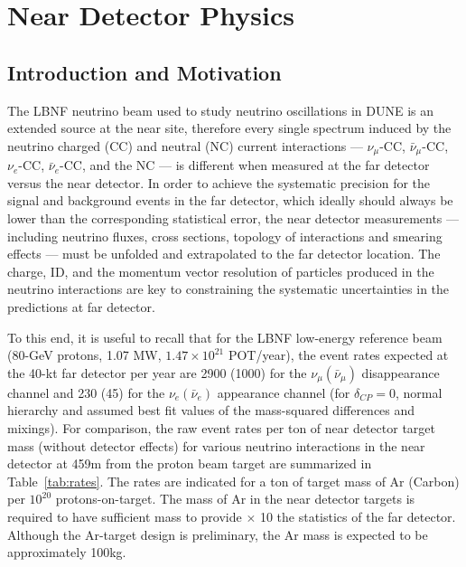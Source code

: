 
\chapter{Near Detector Physics}
\label{ch:physics-nd}

\section{Introduction and Motivation}
\label{sec:physics-nd-introduction}

The LBNF neutrino beam used to study neutrino oscillations in DUNE is
an extended source at the near site, therefore every single spectrum
induced by the neutrino charged (CC) and neutral (NC) current
interactions --- $\nu_\mu$-CC, $\bar \nu_\mu$-CC, $\nu_e$-CC, $\bar
\nu_e$-CC, and the NC --- is different when measured at the far
detector versus the near detector.  In order to achieve the systematic
precision for the signal and background events in the far detector,
which ideally should always be lower than the corresponding
statistical error, the near detector measurements --- including
neutrino fluxes, cross sections, topology of interactions and smearing
effects --- must be unfolded and extrapolated to the far detector
location.  The
charge, ID, and the momentum vector resolution of particles produced
in the neutrino interactions are %
key to constraining the systematic uncertainties in the predictions at
far detector.
%

To this end, it is useful to recall that for the LBNF low-energy reference beam
(80-GeV protons, 1.07 MW, $1.47 \times 10^{21} $ POT/year), the 
event rates expected at the 40-kt far detector per year are 
2900 (1000) for the $\nu_\mu (\bar \nu_\mu)$
disappearance channel and 230 (45) for the $\nu_e(\bar \nu_e)$
appearance channel (for $\delta_{CP}=0$, normal hierarchy and assumed best fit values of
the mass-squared differences and mixings). For comparison, the raw
event rates per ton of near detector target mass (without detector
effects) for various neutrino interactions in the near detector at
459m from the proton beam target are summarized in
Table~\ref{tab:rates}. The rates are indicated for a ton of target
mass of Ar (Carbon) per $10^{20}$ protons-on-target.  The mass of Ar
in the near detector targets is required to have sufficient mass to
provide $\times$ 10 the statistics of the far detector. Although the
Ar-target design is preliminary, the Ar mass is expected to be
approximately 100kg.

